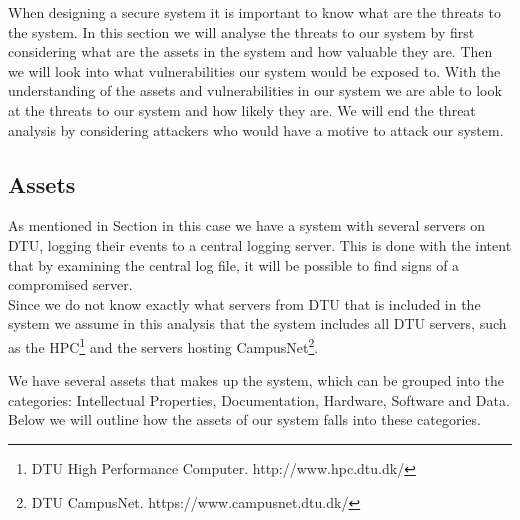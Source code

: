 \begin{comment}
on the security of log entries pre-dating the compromise of a logging machine.
Consequently, we require forward-secure stream integrity, that is, resistance
against post-compromise insertion, alteration, deletion and reordering of pre-
compromise log entries.
Traditional log integrity techniques involve using specialized write-only hard
disks or remote logging whereby copies of log entries are sent to several geo-
graphically distributed machines. With the former, disk substitution can result
in a complete integrity compromise of the entire log. In the latter, the remote
server may go offline (or become unreachable) and the logging machine then
ACM Transactions on Storage, Vol. 5, No. 1, Article 2, Publication date: March 2009.A New Approach to Secure Logging
has to locally buffer new log entries, which, in turn, become subject to attacks.
Furthermore, if the remote server is compromised, log file integrity cannot be
guaranteed.
\end{comment}

When designing a secure system it is important to know what are the threats to the system. In this section we will analyse the threats to our system by first considering what are the assets in the system and how valuable they are. Then we will look into what vulnerabilities our system would be exposed to. With the understanding of the assets and vulnerabilities in our system we are able to look at the threats to our system and how likely they are. We will end the threat analysis by considering attackers who would have a motive to attack our system.
\subsection{Assets}
As mentioned in Section  in this case we have a system with several servers on DTU, logging their events to a central logging server. This is done with the intent that by examining the central log file, it will be possible to find signs of a compromised server.\\
Since we do not know exactly what servers from DTU that is included in the system we assume in this analysis that the system includes all DTU servers, such as the HPC\footnote{DTU High Performance Computer. http://www.hpc.dtu.dk/} and the servers hosting CampusNet\footnote{DTU CampusNet. https://www.campusnet.dtu.dk/}.

We have several assets that makes up the system, which can be grouped into the categories: Intellectual Properties, Documentation, Hardware, Software and Data. Below we will outline how the assets of our system falls into these categories.

